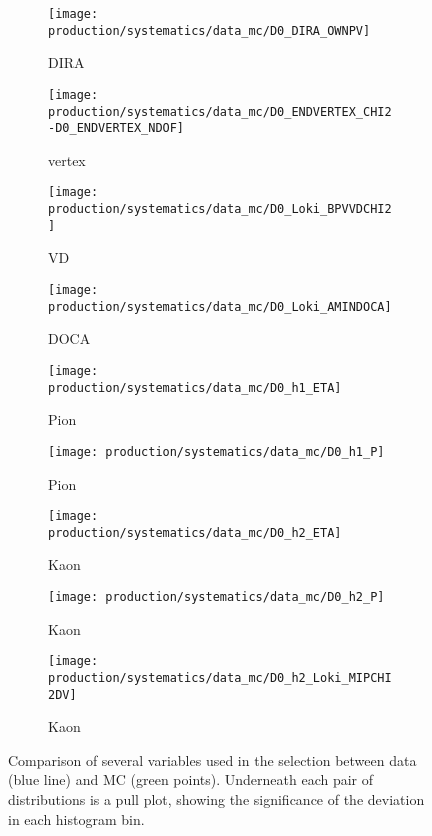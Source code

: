 \begin{figure}
  \begin{subfigure}{0.3\textwidth}
    \centering
    \texttt{[image: production/systematics/data\_mc/D0\_DIRA\_OWNPV]}
    \caption{\PDzero \ac{DIRA}}
  \end{subfigure}
  \begin{subfigure}{0.3\textwidth}
    \centering
    \texttt{[image: production/systematics/data\_mc/D0\_ENDVERTEX\_CHI2-D0\_ENDVERTEX\_NDOF]}
    \caption{\PDzero vertex \chisq}
  \end{subfigure}
  \begin{subfigure}{0.3\textwidth}
    \centering
    \texttt{[image: production/systematics/data\_mc/D0\_Loki\_BPVVDCHI2]}
    \caption{\PDzero VD \chisq}
  \end{subfigure}

  \begin{subfigure}{0.3\textwidth}
    \centering
    \texttt{[image: production/systematics/data\_mc/D0\_Loki\_AMINDOCA]}
    \caption{\PDzero \ac{DOCA}}
  \end{subfigure}
  \begin{subfigure}{0.3\textwidth}
    \centering
    \texttt{[image: production/systematics/data\_mc/D0\_h1\_ETA]}
    \caption{Pion \Eta}
  \end{subfigure}
  \begin{subfigure}{0.3\textwidth}
    \centering
    \texttt{[image: production/systematics/data\_mc/D0\_h1\_P]}
    \caption{Pion \ptot}
  \end{subfigure}

  \begin{subfigure}{0.3\textwidth}
    \centering
    \texttt{[image: production/systematics/data\_mc/D0\_h2\_ETA]}
    \caption{Kaon \Eta}
  \end{subfigure}
  \begin{subfigure}{0.3\textwidth}
    \centering
    \texttt{[image: production/systematics/data\_mc/D0\_h2\_P]}
    \caption{Kaon \ptot}
  \end{subfigure}
  \begin{subfigure}{0.3\textwidth}
    \centering
    \texttt{[image: production/systematics/data\_mc/D0\_h2\_Loki\_MIPCHI2DV]}
    \caption{Kaon \ipchisq}
  \end{subfigure}

  \caption{%
    Comparison of several variables used in the \DzToKpi selection between data
    (blue line) and \ac{MC} (green points).
    Underneath each pair of distributions is a pull plot, showing the
    significance of the deviation in each histogram bin.
  }
  \label{fig:prod:syst:mc:D0ToKpi}
\end{figure}

